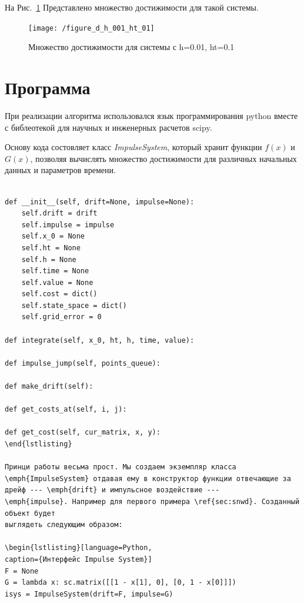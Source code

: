 \documentclass[a4paper,12pt]{article}
\begin{document}
На Рис.~\ref{fig:v1h0.02} Представлено множество достижимости для
такой системы.


\begin{figure}[h]
  \centering

  \texttt{[image: /figure\_d\_h\_001\_ht\_01]}
  \hfil \caption{Множество достижимости для системы с h=0.01, ht=0.1}
  \label{fig:v1h0.02}
\end{figure}

\section{Программа}
\label{sec:program}

При реализации алгоритма использовался язык программирования python
вместе с библеотекой для научных и инженерных расчетов scipy.

Основу кода состовляет класс \emph{ImpulseSystem}, который хранит
функции $f(x)$ и $G(x)$, позволяя вычислять множество достижимости для
различных начальных данных и параметров времени. 

\begin{verbatim}

def __init__(self, drift=None, impulse=None):
    self.drift = drift
    self.impulse = impulse
    self.x_0 = None
    self.ht = None
    self.h = None
    self.time = None
    self.value = None
    self.cost = dict()
    self.state_space = dict()
    self.grid_error = 0

def integrate(self, x_0, ht, h, time, value):

def impulse_jump(self, points_queue):

def make_drift(self):

def get_costs_at(self, i, j):

def get_cost(self, cur_matrix, x, y):
\end{lstlisting}

Принци работы весьма прост. Мы создаем экземпляр класса
\emph{ImpulseSystem} отдавая ему в конструктор функции отвечающие за
дрейф --- \emph{drift} и импульсное воздействие ---
\emph{impulse}. Например для первого примера \ref{sec:snwd}. Созданный объект будет
выглядеть следующим образом:

\begin{lstlisting}[language=Python,
caption={Интерфейс Impulse System}]
F = None
G = lambda x: sc.matrix([[1 - x[1], 0], [0, 1 - x[0]]])
isys = ImpulseSystem(drift=F, impulse=G)
\end{verbatim}
\end{document}
